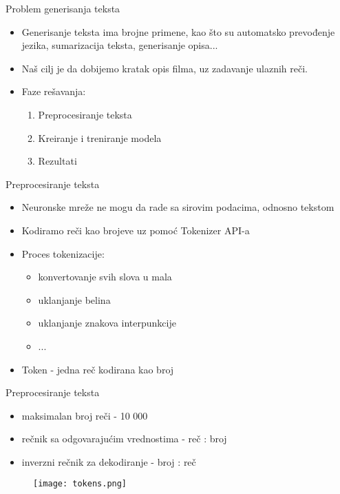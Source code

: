 \documentclass[table]{beamer}
\begin{document}
\begin{frame}{Problem generisanja teksta}
\begin{itemize}
    \item Generisanje teksta ima brojne primene, kao što su automatsko prevođenje jezika, sumarizacija teksta, generisanje opisa...
    \item Naš cilj je da dobijemo kratak opis filma, uz zadavanje ulaznih reči.
    \item Faze rešavanja:
    \begin{enumerate}
        \item Preprocesiranje teksta
        \item Kreiranje i treniranje modela
        \item Rezultati
    \end{enumerate}
\end{itemize}
    
\end{frame}


\begin{frame}{Preprocesiranje teksta}
\begin{itemize}
    \item Neuronske mreže ne mogu da rade sa sirovim podacima, odnosno tekstom
    \item Kodiramo reči kao brojeve uz pomoć Tokenizer API-a
    \item Proces tokenizacije: 
    \begin{itemize}
        \item konvertovanje svih slova u mala
        \item uklanjanje belina
        \item uklanjanje znakova interpunkcije
        \item ...
    \end{itemize}
    \item \alert{Token} - jedna reč kodirana kao broj
\end{itemize}
\end{frame}

\begin{frame}{Preprocesiranje teksta}
\begin{itemize}
    \item maksimalan broj reči - 10 000
    \item rečnik sa odgovarajućim vrednostima - {\color{orange}reč} : {\color{blue}broj}
    \item inverzni rečnik za dekodiranje - {\color{orange}broj} : {\color{blue}reč}
\end{itemize}
\begin{figure}
    \centering
    \texttt{[image: tokens.png]}
\end{figure}

\end{frame}
\end{document}
